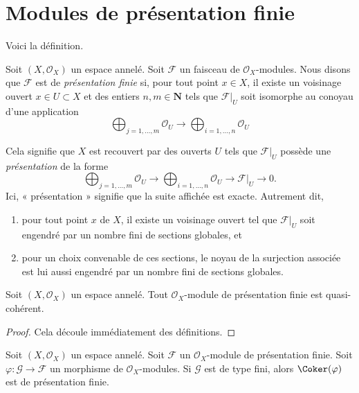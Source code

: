 \section{Modules de présentation finie}
\label{section-finite-presentation}

\noindent
Voici la définition.

\begin{definition}
\label{definition-finite-presentation}
Soit $(X, \mathcal{O}_X)$ un espace annelé.
Soit $\mathcal{F}$ un faisceau de $\mathcal{O}_X$-modules.
Nous disons que $\mathcal{F}$ est de {\it présentation finie}
si, pour tout point $x \in X$, il existe un voisinage ouvert
$x\in U \subset X$ et des entiers $n, m \in \mathbf{N}$ tels que
$\mathcal{F}|_U$ soit isomorphe au conoyau d'une application
$$
\bigoplus\nolimits_{j = 1, \ldots, m}
\mathcal{O}_U
\longrightarrow
\bigoplus\nolimits_{i = 1, \ldots, n}
\mathcal{O}_U
$$
\end{definition}

\noindent
Cela signifie que $X$ est recouvert par des ouverts $U$
tels que $\mathcal{F}|_U$ possède une {\it présentation}
de la forme
$$
\bigoplus\nolimits_{j = 1, \ldots, m}
\mathcal{O}_U
\longrightarrow
\bigoplus\nolimits_{i = 1, \ldots, n}
\mathcal{O}_U
\to
\mathcal{F}|_U
\to
0.
$$
Ici, « présentation » signifie que la suite affichée
est exacte. Autrement dit,
\begin{enumerate}
\item pour tout point $x$ de $X$, il existe
un voisinage ouvert tel que $\mathcal{F}|_U$
soit engendré par un nombre fini de sections globales, et
\item pour un choix convenable de ces sections,
le noyau de la surjection associée est lui aussi
engendré par un nombre fini de sections globales.
\end{enumerate}

\begin{lemma}
\label{lemma-finite-presentation-quasi-coherent}
Soit $(X, \mathcal{O}_X)$ un espace annelé.
Tout $\mathcal{O}_X$-module de présentation finie
est quasi-cohérent.
\end{lemma}

\begin{proof}
Cela découle immédiatement des définitions.
\end{proof}

\begin{lemma}
\label{lemma-cokernel-finite-finite-presentation}
Soit $(X,\mathcal{O}_X)$ un espace annelé. Soit $\mathcal{F}$ un
$\mathcal{O}_X$-module de présentation finie. Soit
$\varphi : \mathcal{G} \to \mathcal{F}$ un morphisme de
$\mathcal{O}_X$-modules. Si $\mathcal{G}$ est de type fini, alors
$\Coker(\varphi)$ est de présentation finie.
\end{lemma}

